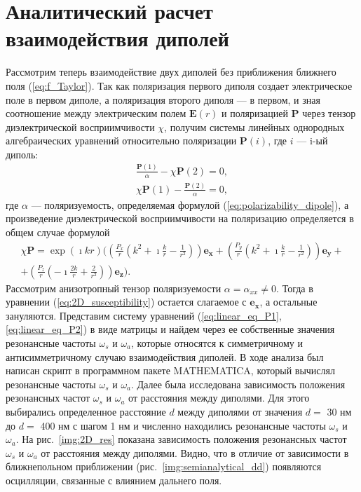 \section{Аналитический расчет взаимодействия диполей}
Рассмотрим теперь взаимодействие двух диполей без приближения ближнего поля (\ref{eq:f_Taylor}). Так как поляризация первого диполя создает электрическое поле в первом диполе, а поляризация второго диполя --- в первом, и зная соотношение между электрическим полем $ \textbf{E} (r) $ и поляризацией $ \textbf{P} $ через тензор диэлектрической восприимчивости $ \chi $, получим системы линейных однородных алгебраических уравнений относительно поляризации $ \textbf{P} (i) $, где $ i $ --- i-ый диполь:
\begin{subequations}
\begin{gather}
\frac{\textbf{P}(1)}{\alpha} - \chi \textbf{P}(2) = 0, \label{eq:linear_eq_P1} \\
\chi \textbf{P}(1) -  \frac{\textbf{P}(2)}{\alpha} = 0, \label{eq:linear_eq_P2} 
\end{gather}
\end{subequations}
где $ \alpha $ --- поляризуемость, определяемая формулой (\ref{eq:polarizability_dipole}), а произведение диэлектрической восприимчивости на поляризацию определяется в общем случае формулой
\begin{multline}
\chi \textbf{P} = \exp (\imath k r) \Bigg( \left( \frac{P_x}{r} \left( k^2 + \imath \frac{k}{r} - \frac{1}{r^2} \right) \right) \mathbf{e_x} + \left( \frac{P_y}{r} \left( k^2 + \imath \frac{k}{r} - \frac{1}{r^2} \right) \right) \mathbf{e_y} + \\
+ \left( \frac{P_z}{r} \left( - \imath \frac{2 k}{r} + \frac{2}{r^2} \right) \right) \mathbf{e_z} \Bigg).
\label{eq:2D_susceptibility}
\end{multline}
Рассмотрим анизотропный тензор поляризуемости $ \alpha = \alpha_{xx} \neq 0 $. Тогда в уравнении (\ref{eq:2D_susceptibility}) остается слагаемое с $ \mathbf{e_x} $, а остальные зануляются. Представим систему уравнений (\ref{eq:linear_eq_P1}, \ref{eq:linear_eq_P2}) в виде матрицы и найдем через ее собственные значения резонансные частоты $ \omega_s $ и $ \omega_a $, которые относятся к симметричному и антисимметричному случаю взаимодействия диполей. В ходе анализа был написан скрипт в программном пакете MATHEMATICA, который вычислял резонансные частоты $ \omega_s $ и $ \omega_a $. Далее была исследована зависимость положения резонансных частот $ \omega_s $ и $ \omega_a $ от расстояния между диполями. Для этого выбирались определенное расстояние $ d $ между диполями от значения $ d = $ 30 нм до $ d = $ 400 нм с шагом 1 нм и численно находились резонансные частоты  $ \omega_s $ и $ \omega_a $. На рис.~\ref{img:2D_res} показана зависимость положения резонансных частот $ \omega_s $ и $ \omega_a $ от расстояния между диполями. Видно, что в отличие от зависимости в ближнепольном приближении (рис.~\ref{img:semianalytical_dd}) появляются осцилляции, связанные с влиянием дальнего поля.

